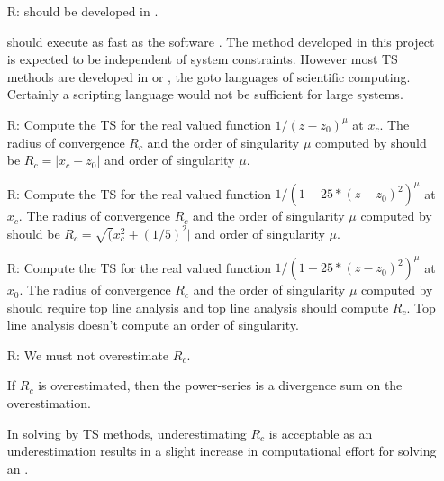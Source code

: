 \documentclass[12pt]{article}
\newcounter{reqnum} %
\newcommand{\rthereqnum}{R\thereqnum}
\newcommand{\rlabel}[1]{\refstepcounter{reqnum} \rthereqnum \label{#1}:}
\begin{document}
\begin{itemize}
  \item[\rlabel{R_Calculate}]  should be developed in \cpp.

     should execute as fast as the \cite{chang1982} software \rdcon. The method developed in this
    project is expected to be independent of system constraints. However
    most TS methods are developed in \cpp or \fortran, the goto languages
    of scientific computing. Certainly a scripting language would not be
    sufficient for large systems.
  
  \item[\rlabel{R_VerifyRealOutput}] Compute the TS for the real valued
    function $1/(z-z_0)^{\mu}$ at $x_c$. The radius of convergence $R_c$
    and the order of singularity $\mu$ computed by  should
    be $R_c = | x_c - z_0 |$ and order of singularity $\mu$.
   
 \item[\rlabel{R_VerifyComplexOutput}] Compute the TS for the real valued function
   $1/(1 + 25*(z-z_0)^2)^{\mu}$ at $x_c$. The radius of convergence $R_c$
    and the order of singularity $\mu$ computed by  should
    be $R_c = \sqrt( x_c^2 + (1/5)^2 |$ and order of singularity $\mu$.
  
 \item[\rlabel{R_VerifyOutput}] Compute the TS for the real valued function
   $1/(1 + 25*(z-z_0)^2)^{\mu}$ at $x_0$. The radius of convergence $R_c$
    and the order of singularity $\mu$ computed by  should
    require top line analysis and top line analysis should compute
    $R_c$. Top line analysis doesn't compute an order of singularity.

  \item[\rlabel{R_Output}] We must not overestimate $R_c$.
    
    If $R_c$ is overestimated, then the power-series is a divergence sum on the overestimation.
  
    In \ode solving by TS methods, underestimating $R_c$ is acceptable as an underestimation
    results in a slight increase in computational effort for solving an \ode \ivp.
\end{itemize}
\end{document}
